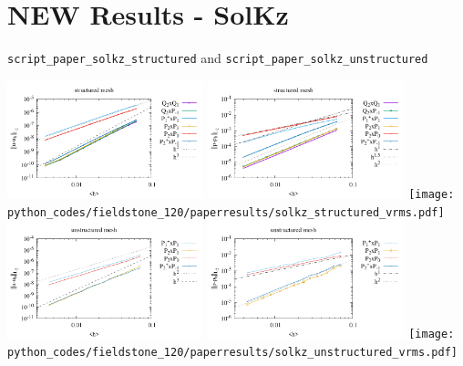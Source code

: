 \section*{NEW Results - SolKz}

{\tt script\_paper\_solkz\_structured} and {\tt script\_paper\_solkz\_unstructured}

\begin{center}
\includegraphics[width=5.7cm]{python_codes/fieldstone_120/paperresults/solkz_structured_errorsV.pdf}
\includegraphics[width=5.7cm]{python_codes/fieldstone_120/paperresults/solkz_structured_errorsP.pdf}
\texttt{[image: python\_codes/fieldstone\_120/paperresults/solkz\_structured\_vrms.pdf]}\\
\includegraphics[width=5.7cm]{python_codes/fieldstone_120/paperresults/solkz_unstructured_errorsV.pdf}
\includegraphics[width=5.7cm]{python_codes/fieldstone_120/paperresults/solkz_unstructured_errorsP.pdf}
\texttt{[image: python\_codes/fieldstone\_120/paperresults/solkz\_unstructured\_vrms.pdf]}
\end{center}


